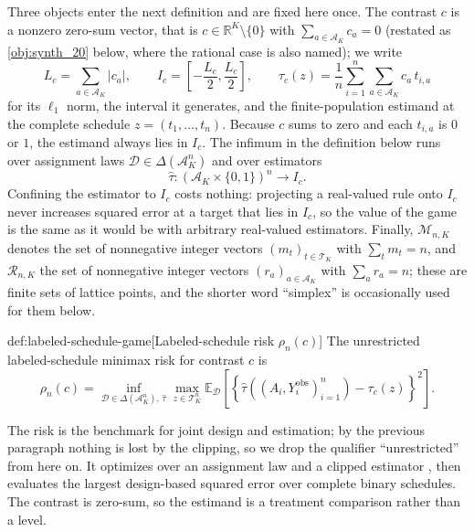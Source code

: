 Three objects enter the next definition and are fixed here once. The contrast \(c\) is a nonzero zero-sum vector, that is \(c\in\mathbb R^K\setminus\{0\}\) with \(\sum_{a\in\mathcal A_K}c_a=0\) (restated as \cref{obj:synth_20} below, where the rational case is also named); we write
\[
L_c=\sum_{a\in\mathcal A_K}|c_a|,
\qquad
I_c=\left[-\frac{L_c}{2},\frac{L_c}{2}\right],
\qquad
\tau_c(z)=\frac1n\sum_{i=1}^n\sum_{a\in\mathcal A_K}c_a\,t_{i,a}
\]
for its \(\ell_1\) norm, the interval it generates, and the finite-population estimand at the complete schedule \(z=(t_1,\ldots,t_n)\). Because \(c\) sums to zero and each \(t_{i,a}\) is \(0\) or \(1\), the estimand always lies in \(I_c\). The infimum in the definition below runs over assignment laws \(\mathcal D\in\Delta(\mathcal A_K^n)\) and over estimators
\[
\widehat\tau\colon(\mathcal A_K\times\{0,1\})^n\to I_c .
\]
Confining the estimator to \(I_c\) costs nothing: projecting a real-valued rule onto \(I_c\) never increases squared error at a target that lies in \(I_c\), so the value of the game is the same as it would be with arbitrary real-valued estimators. Finally, \(\mathcal M_{n,K}\) denotes the set of nonnegative integer vectors \((m_t)_{t\in\mathcal T_K}\) with \(\sum_t m_t=n\), and \(\mathcal R_{n,K}\) the set of nonnegative integer vectors \((r_a)_{a\in\mathcal A_K}\) with \(\sum_a r_a=n\); these are finite sets of lattice points, and the shorter word ``simplex'' is occasionally used for them below.

\begin{definitionv}{def:labeled-schedule-game}[Labeled-schedule risk $\rho_n(c)$]
The unrestricted labeled-schedule minimax risk for contrast \(c\) is
\[
\rho_n(c)=\inf_{\mathcal D\in\Delta(\mathcal A_K^n),\,\widehat\tau}\max_{z\in\mathcal T_K^n}\mathbb E_{\mathcal D}\left[\left\{\widehat\tau((A_i,Y_i^{\mathrm{obs}})_{i=1}^n)-\tau_c(z)\right\}^2\right].
\]
\end{definitionv}

The risk  is the benchmark for joint design and estimation; by the previous paragraph nothing is lost by the clipping, so we drop the qualifier ``unrestricted'' from here on. It optimizes over an assignment law  and a clipped estimator , then evaluates the largest design-based squared error over complete binary schedules. The contrast  is zero-sum, so the estimand is a treatment comparison rather than a level.

